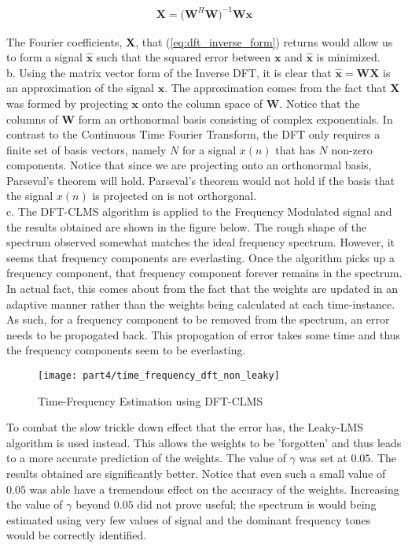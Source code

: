 \begin{align}
\textbf{X} = \big(\textbf{W}^H\textbf{W}\big)^{-1} \textbf{W}\textbf{x}\label{eq:dft_inverse_form}
\end{align}
 
\noindent{}The Fourier coefficients, $\textbf{X}$, that (\ref{eq:dft_inverse_form}) returns would allow us to form a signal $\hat{\textbf{x}}$ such that the squared error between $\textbf{x}$ and $\hat{\textbf{x}}$ is minimized.\\

\noindent{}b. Using the matrix vector form of the Inverse DFT, it is clear that $\hat{\textbf{x}} = \textbf{W}\textbf{X}$ is an approximation of the signal $\textbf{x}$. The approximation comes from the fact that $\textbf{X}$ was formed by projecting $\textbf{x}$ onto the column space of $\textbf{W}$. Notice that the columns of $\textbf{W}$ form an orthonormal basis consisting of complex exponentials. In contrast to the Continuous Time Fourier Transform, the DFT only requires a finite set of basis vectors, namely $N$ for a signal $x(n)$ that has $N$ non-zero components. Notice that since we are projecting onto an orthonormal basis, Parseval's theorem will hold. Parseval's theorem would not hold if the basis that the signal $x(n)$ is projected on is not orthorgonal.\\

\noindent{}c. The DFT-CLMS algorithm is applied to the Frequency Modulated signal and the results obtained are shown in the figure below. The rough shape of the spectrum observed somewhat matches the ideal frequency spectrum. However, it seems that frequency components are everlasting. Once the algorithm picks up a frequency component, that frequency component forever remains in the spectrum. In actual fact, this comes about from the fact that the weights are updated in an adaptive manner rather than the weights being calculated at each time-instance. As such, for a frequency component to be removed from the spectrum, an error needs to be propogated back. This propogation of error takes some time and thus the frequency components seem to be everlasting.
 
\begin{figure}[H]
\centering{}
\texttt{[image: part4/time\_frequency\_dft\_non\_leaky]}
\caption{Time-Frequency Estimation using DFT-CLMS}
\end{figure}

\noindent{}To combat the slow trickle down effect that the error has, the Leaky-LMS algorithm is used instead. This allows the weights to be 'forgotten' and thus leads to a more accurate prediction of the weights. The value of $\gamma$ was set at $0.05$. The results obtained are significantly better. Notice that even such a small value of $0.05$ was able have a tremendous effect on the accuracy of the weights. Increasing the value of $\gamma$ beyond $0.05$ did not prove useful; the spectrum is would being estimated using very few values of signal and the dominant frequency tones would be correctly identified. 

